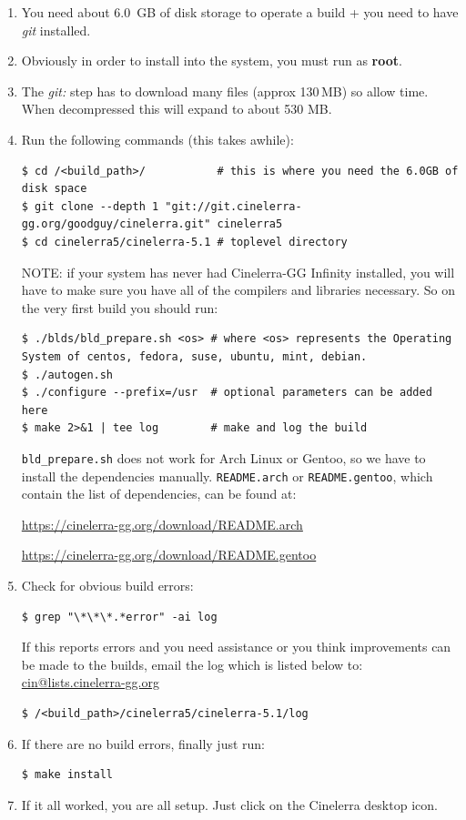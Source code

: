 \begin{enumerate}
    \item 
        You need about 6.0 \,GB of disk storage to operate a build + you need to have \textit{git} installed.
    \item  Obviously in order to install into the system, you must run as \textbf{root}.
    \item  The \textit{git:} step has to download many files (approx 130\,MB) so allow time.  When decompressed this will expand to about 530 MB.
    \item  Run the following commands (this takes awhile):

        \begin{lstlisting}[numbers=none]
$ cd /<build_path>/           # this is where you need the 6.0GB of disk space
$ git clone --depth 1 "git://git.cinelerra-gg.org/goodguy/cinelerra.git" cinelerra5 
$ cd cinelerra5/cinelerra-5.1 # toplevel directory
        \end{lstlisting}

        NOTE: if your system has never had Cinelerra-GG Infinity installed, you will have to make sure you have all of the compilers and libraries necessary.  
        So on the very first build you should run:

        \begin{lstlisting}[numbers=none]
$ ./blds/bld_prepare.sh <os> # where <os> represents the Operating System of centos, fedora, suse, ubuntu, mint, debian.
$ ./autogen.sh
$ ./configure --prefix=/usr  # optional parameters can be added here
$ make 2>&1 | tee log        # make and log the build
        \end{lstlisting}
        \texttt{bld\_prepare.sh} does not work for Arch Linux or Gentoo, so we have to install the dependencies manually. \texttt{README.arch} or \texttt{README.gentoo}, which contain the list of dependencies, can be found at: \\ 
{\small \url{https://cinelerra-gg.org/download/README.arch}

	\url{https://cinelerra-gg.org/download/README.gentoo}}
    \item  Check for obvious build errors:
        \begin{lstlisting}[numbers=none]
$ grep "\*\*\*.*error" -ai log
        \end{lstlisting}
        If this reports errors and you need assistance or you think improvements can be made to the builds,
        email the log which is listed below to: \href{mailto:cin@lists.cinelerra-gg.org}{cin@lists.cinelerra-gg.org}
        \begin{lstlisting}[numbers=none]
$ /<build_path>/cinelerra5/cinelerra-5.1/log
        \end{lstlisting}
    \item  If there are no build errors, finally just run:
        \begin{lstlisting}[numbers=none]
   $ make install
        \end{lstlisting}
    \item  If it all worked, you are all setup. Just click on the Cinelerra desktop icon.
\end{enumerate}

